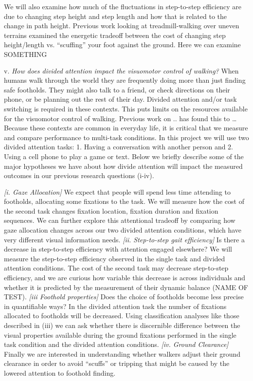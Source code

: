 We will also examine how much of the fluctuations in step-to-step
efficiency are due to changing step height and step length and how that
is related to the change in path height. Previous work looking at
treadmill-walking over uneven terrains examined the energetic tradeoff
between the cost of changing step height/length vs. ``scuffing'' your
foot against the ground. Here we can examine SOMETHING

v. \emph{How does divided attention impact the visuomotor control of
walking?} When humans walk through the world they are frequently doing
more than just finding safe footholds. They might also talk to a friend,
or check directions on their phone, or be planning out the rest of their
day. Divided attention and/or task switching is required in these
contexts. This puts limits on the resources available for the visuomotor
control of walking. Previous work on .. has found this to \ldots{}
Because these contexts are common in everyday life, it is critical that
we measure and compare performance to multi-task conditions. In this
project we will use two divided attention tasks: 1. Having a
conversation with another person and 2. Using a cell phone to play a
game or text. Below we briefly describe some of the major hypotheses we
have about how divide attention will impact the measured outcomes in our
previous research questions (i-iv).

\emph{{[}i. Gaze Allocation{]}} We expect that people will spend less
time attending to footholds, allocating some fixations to the task. We
will measure how the cost of the second task changes fixation location,
fixation duration and fixation sequences. We can further explore this
attentional tradeoff by comparing how gaze allocation changes across our
two divided attention conditions, which have very different visual
information needs. \emph{{[}ii. Step-to-step gait efficiency{]}} Is
there a decrease in step-to-step efficiency with attention engaged
elsewhere? We will measure the step-to-step efficiency observed in the
single task and divided attention conditions. The cost of the second
task may decrease step-to-step efficiency, and we are curious how
variable this decrease is across individuals and whether it is predicted
by the measurement of their dynamic balance (NAME OF TEST). \emph{{[}iii
Foothold properties{]}} Does the choice of footholds become less precise
in quantifiable ways? In the divided attention task the number of
fixations allocated to footholds will be decreased. Using classification
analyses like those described in (iii) we can ask whether there is
discernible difference between the visual properties available during
the ground fixations performed in the single task condition and the
divided attention conditions. \emph{{[}iv. Ground Clearance{]}} Finally
we are interested in understanding whether walkers adjust their ground
clearance in order to avoid ``scuffs'' or tripping that might be caused
by the lowered attention to foothold finding.

